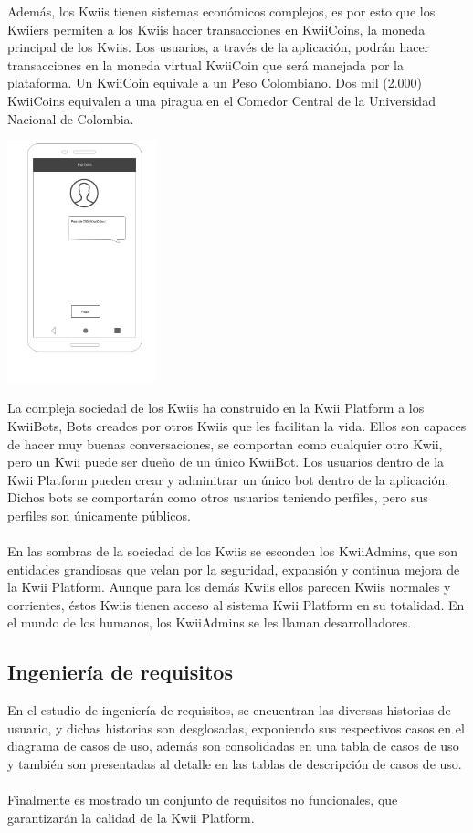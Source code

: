 Además, los Kwiis tienen sistemas económicos complejos, es por esto que los Kwiiers permiten a los Kwiis hacer transacciones en KwiiCoins, la moneda principal de los Kwiis. Los usuarios, a través de la aplicación, podrán hacer transacciones en la moneda virtual KwiiCoin que será manejada por la plataforma. Un KwiiCoin equivale a un Peso Colombiano. Dos mil (2.000) KwiiCoins equivalen a una piragua en el Comedor Central de la Universidad Nacional de Colombia.
\begin{center}
    \includegraphics[height=7cm]{Figures/P1/example_5.jpeg}    
\end{center}
La compleja sociedad de los Kwiis ha construido en la Kwii Platform a los KwiiBots, Bots creados por otros Kwiis que les facilitan la vida. Ellos son capaces de hacer muy buenas conversaciones, se comportan como cualquier otro Kwii, pero un Kwii puede ser dueño de un único KwiiBot. Los usuarios dentro de la Kwii Platform pueden crear y adminitrar un único bot dentro de la aplicación. Dichos bots se comportarán como otros usuarios teniendo perfiles, pero sus perfiles son únicamente públicos.\\\\
En las sombras de la sociedad de los Kwiis se esconden los KwiiAdmins, que son entidades grandiosas que velan por la seguridad, expansión y continua mejora de la Kwii Platform. Aunque para los demás Kwiis ellos parecen Kwiis normales y corrientes, éstos Kwiis tienen acceso al sistema Kwii Platform en su totalidad. En el mundo de los humanos, los KwiiAdmins se les llaman desarrolladores.

\subsection{Ingeniería de requisitos}

En el estudio de ingeniería de requisitos, se encuentran las diversas historias de usuario, y dichas historias son desglosadas, exponiendo sus respectivos casos en el diagrama de casos de uso, además son consolidadas en una tabla de casos de uso y también son presentadas al detalle en las tablas de descripción de casos de uso.
\\\\
Finalmente es mostrado un conjunto de requisitos no funcionales, que garantizarán la calidad de la Kwii Platform.

